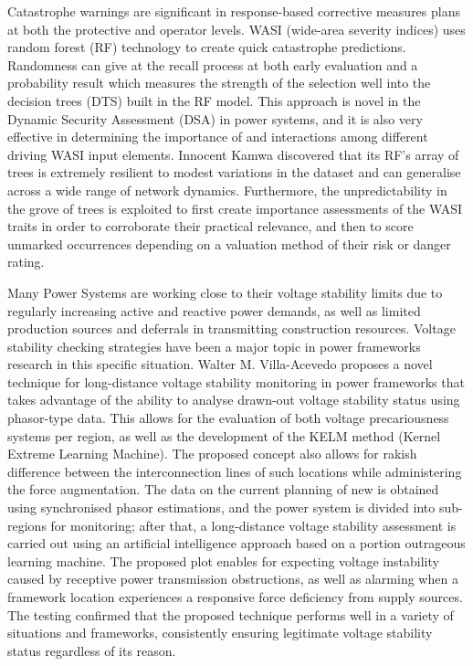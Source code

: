 Catastrophe warnings are significant in response-based corrective measures plans at both the protective and operator levels. WASI (wide-area severity indices) uses random forest (RF) technology to create quick catastrophe predictions. Randomness can give at the recall process at both early evaluation and a probability result which measures the strength of the selection well into the decision trees (DTS) built in the RF model. This approach is novel in the Dynamic Security Assessment (DSA) in power systems, and it is also very effective in determining the importance of and interactions among different driving WASI input elements. Innocent Kamwa \cite{L13} discovered that its RF's array of trees is extremely resilient to modest variations in the dataset and can generalise across a wide range of network dynamics. Furthermore, the unpredictability in the grove of trees is exploited to first create importance assessments of the WASI traits in order to corroborate their practical relevance, and then to score unmarked occurrences depending on a valuation method of their risk or danger rating.

Many Power Systems are working close to their voltage stability limits due to regularly increasing active and reactive power demands, as well as limited production sources and deferrals in transmitting construction resources. Voltage stability checking strategies have been a major topic in power frameworks research in this specific situation. Walter M. Villa-Acevedo \cite{L15} proposes a novel technique for long-distance voltage stability monitoring in power frameworks that takes advantage of the ability to analyse drawn-out voltage stability status using phasor-type data. This allows for the evaluation of both voltage precariousness systems per region, as well as the development of the KELM method (Kernel Extreme Learning Machine). The proposed concept also allows for rakish difference between the interconnection lines of such locations while administering the force augmentation. The data on the current planning of new is obtained using synchronised phasor estimations, and the power system is divided into sub-regions for monitoring; after that, a long-distance voltage stability assessment is carried out using an artificial intelligence approach based on a portion outrageous learning machine. The proposed plot enables for expecting voltage instability caused by receptive power transmission obstructions, as well as alarming when a framework location experiences a responsive force deficiency from supply sources. The testing confirmed that the proposed technique performs well in a variety of situations and frameworks, consistently ensuring legitimate voltage stability status regardless of its reason.


